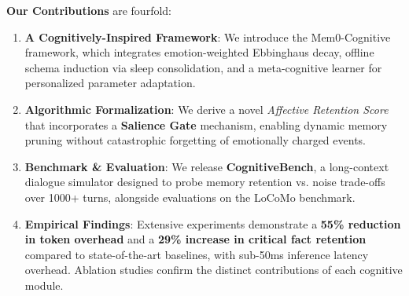 \textbf{Our Contributions} are fourfold:
\begin{enumerate}
    \item \textbf{A Cognitively-Inspired Framework}: We introduce the Mem0-Cognitive framework, which integrates emotion-weighted Ebbinghaus decay, offline schema induction via sleep consolidation, and a meta-cognitive learner for personalized parameter adaptation.
    \item \textbf{Algorithmic Formalization}: We derive a novel \textit{Affective Retention Score} that incorporates a \textbf{Salience Gate} mechanism, enabling dynamic memory pruning without catastrophic forgetting of emotionally charged events.
    \item \textbf{Benchmark \& Evaluation}: We release \textbf{CognitiveBench}, a long-context dialogue simulator designed to probe memory retention vs. noise trade-offs over 1000+ turns, alongside evaluations on the LoCoMo benchmark.
    \item \textbf{Empirical Findings}: Extensive experiments demonstrate a \textbf{55\% reduction in token overhead} and a \textbf{29\% increase in critical fact retention} compared to state-of-the-art baselines, with sub-50ms inference latency overhead. Ablation studies confirm the distinct contributions of each cognitive module.
\end{enumerate}
